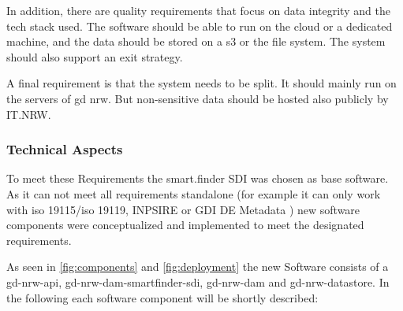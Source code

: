 \documentclass[11pt, titlepage, a4paper]{article}
\begin{document}
In addition, there are quality requirements that focus on data integrity and the tech stack used. The software should be able to run on the cloud or a dedicated machine, and the data should be stored on a \gls{s3} or the file system. The system should also support an exit strategy.

A final requirement is that the system needs to be split. It should mainly run on the servers of  \gls{gd} \gls {nrw}. But  non-sensitive data should be hosted also publicly by IT.NRW. 

\subsubsection{Technical Aspects}
To meet these Requirements the smart.finder SDI was chosen as base software. As it can not meet all requirements standalone (for example it can only work with \gls{iso} 19115/\gls{iso} 19119, INPSIRE \cite{temporarymiwp2021-2024sub-group2.3.1TechnicalGuidanceImplementation} or GDI DE Metadata \cite{gdi-dearbeitskreismetadatenArchitekturGeodateninfrastrukturDeutschlandKonventionen}) new software components were conceptualized and implemented to meet the designated requirements.



As seen in \ref{fig:components} and \ref{fig:deployment} the new Software consists of a gd-nrw-api, gd-nrw-dam-smartfinder-sdi, gd-nrw-dam and gd-nrw-datastore.
In the following each software component will be shortly described:
\end{document}
